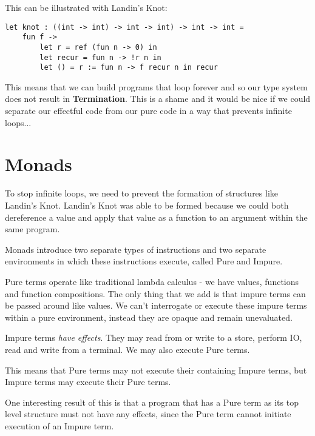 \documentclass{article}
\begin{document}
This can be illustrated with Landin's Knot:

\begin{lstlisting}
let knot : ((int -> int) -> int -> int) -> int -> int =
    fun f ->
        let r = ref (fun n -> 0) in
        let recur = fun n -> !r n in
        let () = r := fun n -> f recur n in recur
\end{lstlisting}

This means that we can build programs that loop forever and so our type system does not result in \textbf{Termination}. This is a shame and it would be nice if we could separate our effectful code from our pure code in a way that prevents infinite loops...

\newpage
\section{Monads}
To stop infinite loops, we need to prevent the formation of structures like Landin's Knot. Landin's Knot was able to be formed because we could both dereference a value and apply that value as a function to an argument within the same program. 

Monads introduce two separate types of instructions and two separate environments in which these instructions execute, called Pure and Impure.

Pure terms operate like traditional lambda calculus - we have values, functions and function compositions. The only thing that we add is that impure terms can be passed around like values. We can't interrogate or execute these impure terms within a pure environment, instead they are opaque and remain unevaluated. 

Impure terms \textit{have effects}. They may read from or write to a store, perform IO, read and write from a terminal. We may also execute Pure terms.

This means that Pure terms may not execute their containing Impure terms, but Impure terms may execute their Pure terms.

One interesting result of this is that a program that has a Pure term as its top level structure must not have any effects, since the Pure term cannot initiate execution of an Impure term.
\end{document}
